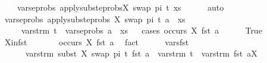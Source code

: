 \begin{isabellebody}
\ \ \ \ {\isasymunion}{\isacharparenleft}{\kern0pt}vars{\isacharunderscore}{\kern0pt}eprobs\ {\isacharparenleft}{\kern0pt}apply{\isacharunderscore}{\kern0pt}subst{\isacharunderscore}{\kern0pt}eprobs{\isacharbrackleft}{\kern0pt}{\isacharparenleft}{\kern0pt}X{\isacharcomma}{\kern0pt}\ swap\ pi\ t{\isacharparenright}{\kern0pt}{\isacharbrackright}{\kern0pt}\ xs{\isacharparenright}{\kern0pt}{\isacharparenright}{\kern0pt}{\isachardoublequoteclose}\isanewline
\ \ \ \ \isamarkupfalse%
\ auto\isanewline
\ \ \isamarkupfalse%
\ \isamarkupfalse%
\ {\isachardoublequoteopen}vars{\isacharunderscore}{\kern0pt}eprobs\ {\isacharparenleft}{\kern0pt}apply{\isacharunderscore}{\kern0pt}subst{\isacharunderscore}{\kern0pt}eprobs\ {\isacharbrackleft}{\kern0pt}{\isacharparenleft}{\kern0pt}X{\isacharcomma}{\kern0pt}\ swap\ pi\ t{\isacharparenright}{\kern0pt}{\isacharbrackright}{\kern0pt}\ {\isacharparenleft}{\kern0pt}a\ {\isacharhash}{\kern0pt}\ xs{\isacharparenright}{\kern0pt}{\isacharparenright}{\kern0pt}\isanewline
\ \ \ \ {\isasymsubseteq}\ vars{\isacharunderscore}{\kern0pt}trm\ t\ {\isasymunion}\ vars{\isacharunderscore}{\kern0pt}eprobs\ {\isacharparenleft}{\kern0pt}a\ {\isacharhash}{\kern0pt}\ xs{\isacharparenright}{\kern0pt}{\isachardoublequoteclose}\isanewline
\ \ \isamarkupfalse%
{\isacharparenleft}{\kern0pt}cases\ {\isachardoublequoteopen}occurs\ X\ {\isacharparenleft}{\kern0pt}fst\ a{\isacharparenright}{\kern0pt}{\isachardoublequoteclose}{\isacharparenright}{\kern0pt}\isanewline
\ \ \ \ \isamarkupfalse%
\ True\isanewline
\ \ \ \ \isamarkupfalse%
\ X{\isacharunderscore}{\kern0pt}in{\isacharunderscore}{\kern0pt}fst{\isacharcolon}{\kern0pt}\ \isanewline
\ \ \ \ \ \ {\isachardoublequoteopen}occurs\ X\ {\isacharparenleft}{\kern0pt}fst\ a{\isacharparenright}{\kern0pt}{\isachardoublequoteclose}\ \isamarkupfalse%
\ fact\isanewline
\ \ \ \ \isamarkupfalse%
\ vars{\isacharunderscore}{\kern0pt}fst{\isacharcolon}{\kern0pt}\isanewline
\ \ \ \ \ \ {\isachardoublequoteopen}vars{\isacharunderscore}{\kern0pt}trm\ {\isacharparenleft}{\kern0pt}subst\ {\isacharbrackleft}{\kern0pt}{\isacharparenleft}{\kern0pt}X{\isacharcomma}{\kern0pt}\ swap\ pi\ t{\isacharparenright}{\kern0pt}{\isacharbrackright}{\kern0pt}\ {\isacharparenleft}{\kern0pt}fst\ a{\isacharparenright}{\kern0pt}{\isacharparenright}{\kern0pt}\ {\isacharequal}{\kern0pt}\ {\isacharparenleft}{\kern0pt}vars{\isacharunderscore}{\kern0pt}trm\ t\ {\isasymunion}\ vars{\isacharunderscore}{\kern0pt}trm\ {\isacharparenleft}{\kern0pt}fst\ a{\isacharparenright}{\kern0pt}{\isacharparenright}{\kern0pt}{\isacharminus}{\kern0pt}{\isacharbraceleft}{\kern0pt}X{\isacharbraceright}{\kern0pt}{\isachardoublequoteclose}\isanewline

\end{isabellebody}
